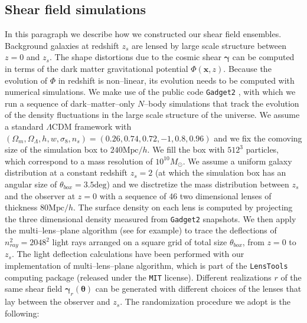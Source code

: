\documentclass[reprint,aps,prd,superscriptaddress,showkeys,showpacs]{revtex4-1}
\newcommand{\bb}[1]{\mathbf{#1}}
\begin{document}
\subsection{Shear field simulations}
\label{shearsim}
%
In this paragraph we describe how we constructed our shear field ensembles. Background galaxies at redshift $z_s$ are lensed by large scale structure between $z=0$ and $z_s$. The shape distortions due to the cosmic shear $\pmb{\gamma}$ can be computed in terms of the dark matter gravitational potential $\Phi(\bb{x},z)$. Because the evolution of $\Phi$ in redshift is non--linear, its evolution needs to be computed with numerical simulations. We make use of the public code \texttt{Gadget2} \citep{Gadget2}, with which we run a sequence of dark--matter--only $N$--body simulations that track the evolution of the density fluctuations in the large scale structure of the universe. We assume a standard $\Lambda$CDM framework with $(\Omega_m,\Omega_\Lambda,h,w,\sigma_8,n_s)=(0.26,0.74,0.72,-1,0.8,0.96)$ and we fix the comoving size of the simulation box to $240\mathrm{Mpc}/h$. We fill the box with $512^3$ particles, which correspond to a mass resolution of $10^{10}M_\odot$. We assume a uniform galaxy distribution at a constant redshift $z_s=2$ (at which the simulation box has an angular size of $\theta_{box}=3.5\mathrm{deg}$) and we disctretize the mass distribution between $z_s$ and the observer at $z=0$ with a sequence of 46 two dimensional lenses of thickness $80\mathrm{Mpc}/h$. The surface density on each lens is computed by projecting the three dimensional density measured from \texttt{Gadget2} snapshots. We then apply the multi--lens--plane algorithm (see \citep{RayTracingHartlap,RayTracingJain} for example) to trace the deflections of $n_{ray}^2=2048^2$ light rays arranged on a square grid of total size $\theta_{box}$, from $z=0$ to $z_s$. The light deflection calculations have been performed with our implementation of multi--lens--plane algorithm, which is part of the \texttt{LensTools} computing package \citep{LensTools} (released under the \texttt{MIT} license). Different realizations $r$ of the same shear field $\pmb{\gamma}_r(\pmb{\theta})$ can be generated with different choices of the lenses that lay between the observer and $z_s$. The randomization procedure we adopt is the following:
\end{document}
